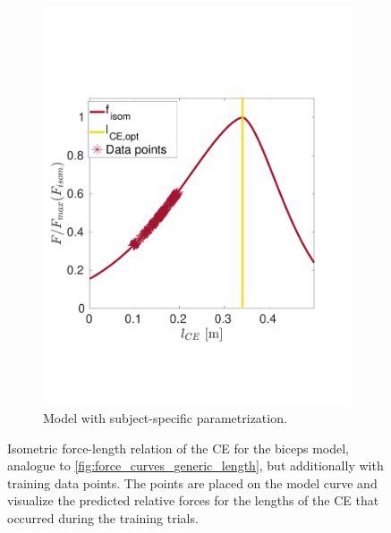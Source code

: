\begin{figure}
  \quad
  \begin{subfigure}[t]{0.47\textwidth}%
    \centering%
    \includegraphics[width=\textwidth]{images/summer_school_study/biceps_optimized.pdf}%
    \caption{Model with subject-specific parametrization.}%
    \label{fig:biceps_b}%
  \end{subfigure}%
  \caption{Isometric force-length relation of the CE for the biceps model, analogue to \cref{fig:force_curves_generic_length}, but additionally with training data points. The points are placed on the model curve and visualize the predicted relative forces for the lengths of the CE that occurred during the training trials.}%
  \label{fig:biceps_working_area}%
\end{figure}%



